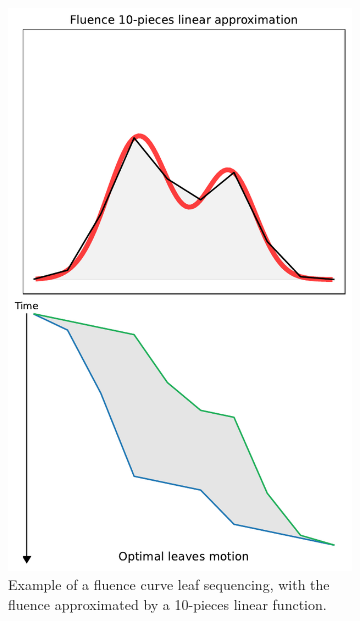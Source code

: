 \begin{figure}
	\centering
	\begin{subfigure}[b]{0.4\textwidth}
		\includegraphics[width=\linewidth]{_fluence_leaf_sequencing_10.pdf}
		\caption{Example of a fluence curve leaf sequencing, with the fluence approximated by a 10-pieces linear function.}
		\label{fig:fluence_leaf_sequencing_10}
	\end{subfigure}
	\begin{subfigure}[b]{0.17\textwidth}

\end{subfigure}
\end{figure}
